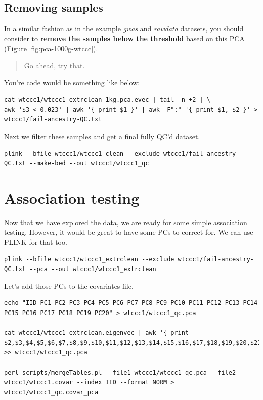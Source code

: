 \documentclass[
]{book}
\begin{document}
\hypertarget{removing-samples-1}{%
\subsection{Removing samples}\label{removing-samples-1}}

In a similar fashion as in the example \emph{gwas} and \emph{rawdata} datasets, you should consider to \textbf{remove the samples below the threshold} based on this PCA (Figure \ref{fig:pca-1000g-wtccc}).

\begin{quote}
Go ahead, try that.
\end{quote}

You're code would be something like below:

\begin{verbatim}
cat wtccc1/wtccc1_extrclean_1kg.pca.evec | tail -n +2 | \
awk '$3 < 0.023' | awk '{ print $1 }' | awk -F":" '{ print $1, $2 }' > wtccc1/fail-ancestry-QC.txt
\end{verbatim}

Next we filter these samples and get a final fully QC'd dataset.

\begin{verbatim}
plink --bfile wtccc1/wtccc1_clean --exclude wtccc1/fail-ancestry-QC.txt --make-bed --out wtccc1/wtccc1_qc
\end{verbatim}

\hypertarget{association-testing}{%
\section{Association testing}\label{association-testing}}

Now that we have explored the data, we are ready for some simple association testing. However, it would be great to have some PCs to correct for. We can use PLINK for that too.

\begin{verbatim}
plink --bfile wtccc1/wtccc1_extrclean --exclude wtccc1/fail-ancestry-QC.txt --pca --out wtccc1/wtccc1_extrclean
\end{verbatim}

Let's add those PCs to the covariates-file.

\begin{verbatim}
echo "IID PC1 PC2 PC3 PC4 PC5 PC6 PC7 PC8 PC9 PC10 PC11 PC12 PC13 PC14 PC15 PC16 PC17 PC18 PC19 PC20" > wtccc1/wtccc1_qc.pca

cat wtccc1/wtccc1_extrclean.eigenvec | awk '{ print $2,$3,$4,$5,$6,$7,$8,$9,$10,$11,$12,$13,$14,$15,$16,$17,$18,$19,$20,$21,$22}' >> wtccc1/wtccc1_qc.pca

perl scripts/mergeTables.pl --file1 wtccc1/wtccc1_qc.pca --file2 wtccc1/wtccc1.covar --index IID --format NORM > wtccc1/wtccc1_qc.covar_pca
\end{verbatim}
\end{document}
